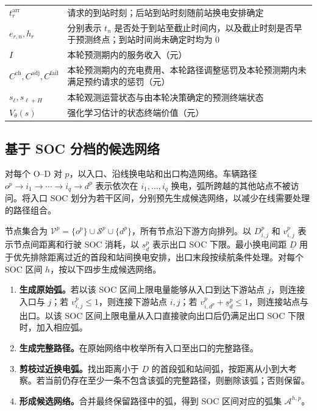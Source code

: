 \begin{longtable}{@{}p{4.4cm}p{11.1cm}@{}}
$t_r^{\mathrm{arr}}$ & 请求的到站时刻；后站到站时刻随前站换电安排确定 \\
$e_{r,n},h_r$ & 分别表示 $t_n$ 是否处于到站至截止时间内，以及截止时刻是否早于预测终点；到站时间尚未确定时均为 $0$ \\
$I$ & 本轮预测期内的服务收入（元） \\
$C^{\mathrm{ch}},C^{\mathrm{adj}},C^{\mathrm{fail}}$ & 本轮预测期内的充电费用、本轮路径调整惩罚及本轮预测期内未满足预约请求的惩罚（元） \\
$s_\ell,s_{\ell+H}$ & 本轮观测运营状态与由本轮决策确定的预测终端状态 \\
$V_\theta(s)$ & 强化学习估计的状态终端价值（元） \\
\end{longtable}

\subsection{基于 SOC 分档的候选网络}
\label{sec:network}
对每个 O--D 对 $p$，以入口、沿线换电站和出口构造网络。车辆路径
$o^p\to i_1\to\cdots\to i_q\to d^p$
表示依次在 $i_1,\ldots,i_q$ 换电，弧所跨越的其他站点不被访问。将入口 SOC 划分为若干区间，分别预先生成候选网络，以减少在线需要处理的路径组合。

节点集合为 $\mathcal V^p=\{o^p\}\cup\mathcal S^p\cup\{d^p\}$，所有节点沿下游方向排列。以 $D_{i,j}^p$ 和 $v_{i,j}^p$ 表示节点间距离和行驶 SOC 消耗，以 $\underline s_d^p$ 表示出口 SOC 下限。最小换电间距 $\underline D$ 用于优先排除距离过近的首段和站间换电安排，出口末段按续航条件处理。对每个 SOC 区间 $h$，按以下四步生成候选网络。
\begin{enumerate}[label=\textbf{步骤\arabic*.},leftmargin=4.2em]
\item \textbf{生成原始弧。}若以该 SOC 区间上限电量能够从入口到达下游站点 $j$，则连接入口与 $j$；若 $v_{i,j}^p\le1$，则连接下游站点 $i,j$；若 $v_{i,d^p}^p+\underline s_d^p\le1$，则连接站点与出口。以该 SOC 区间上限电量从入口直接驶向出口后仍满足出口 SOC 下限时，加入相应弧。
\item \textbf{生成完整路径。}在原始网络中枚举所有入口至出口的完整路径。
\item \textbf{剪枝过近换电弧。}找出距离小于 $\underline D$ 的首段弧和站间弧，按距离从小到大考察。若当前仍存在至少一条不包含该弧的完整路径，则删除该弧；否则保留。
\item \textbf{形成候选网络。}合并最终保留路径中的弧，得到 SOC 区间对应的弧集 $\mathcal A^{h,p}$。
\end{enumerate}

